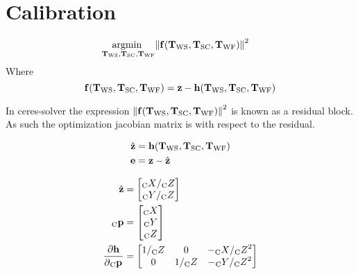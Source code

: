 \chapter{Calibration}

\begin{align}
  \Argmin{\Tf{\world}{\sensor}, \Tf{\sensor}{\cam}, \Tf{\world}{\fiducial}}
  &\Norm{\Vec{f}(\Tf{\world}{\sensor}, \Tf{\sensor}{\cam}, \Tf{\world}{\fiducial})}^{2}
\end{align}
%
Where 
%
\begin{equation}
  \Vec{f}(\Tf{\world}{\sensor}, \Tf{\sensor}{\cam}, \Tf{\world}{\fiducial}) =
  \measurement - \projFunc(\Tf{\world}{\sensor}, \Tf{\sensor}{\cam}, \Tf{\world}{\fiducial})
\end{equation}

In ceres-solver the expression $\Norm{\Vec{f}(\Tf{\world}{\sensor},
\Tf{\sensor}{\cam}, \Tf{\world}{\fiducial})}^{2}$ is known as a residual block.
As such the optimization jacobian matrix is with respect to the residual.


\begin{align}
  \hat{\measurement} &=
    \projFunc(\Tf{\world}{\sensor},
              \Tf{\sensor}{\cam},
              \Tf{\world}{\fiducial}) \\
  \Vec{e} &= \measurement - \hat{\measurement}
\end{align}

\begin{align}
  \hat{\measurement}
		&=
			\begin{bmatrix}
				\KineNotationBare{X}{\cam} / \KineNotationBare{Z}{\cam} \\
				\KineNotationBare{Y}{\cam} / \KineNotationBare{Z}{\cam}
			\end{bmatrix} \\
  \Point{\cam}{\fiducial_{i}}
		&=
			\begin{bmatrix}
				\KineNotationBare{X}{\cam} \\
				\KineNotationBare{Y}{\cam} \\
				\KineNotationBare{Z}{\cam}
			\end{bmatrix} \\
  \dfrac{\partial{\projFunc}}{\partial{\Pt{\cam}}}
		&=
			\begin{bmatrix}
				1 / \KineNotationBare{Z}{\cam}
				& 0
				& -\KineNotationBare{X}{\cam} / \KineNotationBare{Z}{\cam}^{2} \\
				0
				& 1 / \KineNotationBare{Z}{\cam}
				& -\KineNotationBare{Y}{\cam} / \KineNotationBare{Z}{\cam}^{2}
			\end{bmatrix}
\end{align}

